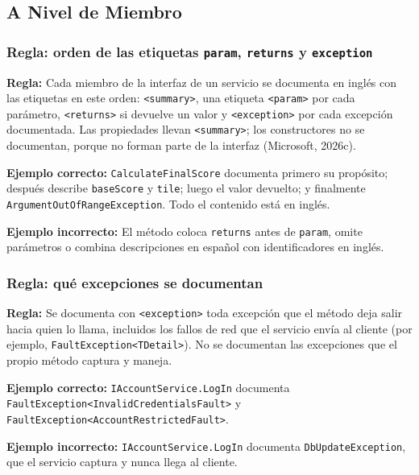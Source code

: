 \subsection{A Nivel de Miembro}

\subsubsection{Regla: orden de las etiquetas \texttt{param}, \texttt{returns} y \texttt{exception}}

\textbf{Regla:} Cada miembro de la interfaz de un servicio se documenta en inglés con las etiquetas en este orden: \texttt{<summary>}, una etiqueta \texttt{<param>} por cada parámetro, \texttt{<returns>} si devuelve un valor y \texttt{<exception>} por cada excepción documentada. Las propiedades llevan \texttt{<summary>}; los constructores no se documentan, porque no forman parte de la interfaz (Microsoft, 2026c).

\textbf{Ejemplo correcto:} \texttt{CalculateFinalScore} documenta primero su propósito; después describe \texttt{baseScore} y \texttt{tile}; luego el valor devuelto; y finalmente \texttt{ArgumentOutOfRangeException}. Todo el contenido está en inglés.

\textbf{Ejemplo incorrecto:} El método coloca \texttt{returns} antes de \texttt{param}, omite parámetros o combina descripciones en español con identificadores en inglés.

\subsubsection{Regla: qué excepciones se documentan}

\textbf{Regla:} Se documenta con \texttt{<exception>} toda excepción que el método deja salir hacia quien lo llama, incluidos los fallos de red que el servicio envía al cliente (por ejemplo, \texttt{FaultException<TDetail>}). No se documentan las excepciones que el propio método captura y maneja.

\textbf{Ejemplo correcto:} \texttt{IAccountService.LogIn} documenta \texttt{FaultException<InvalidCredentialsFault>} y \texttt{FaultException<AccountRestrictedFault>}.

\textbf{Ejemplo incorrecto:} \texttt{IAccountService.LogIn} documenta \texttt{DbUpdateException}, que el servicio captura y nunca llega al cliente.
